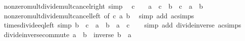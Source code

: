 \begin{isabellebody}
\isamarkupfalse%
%
\endisatagproof
{\isafoldproof}%
%
\isadelimproof
\isanewline
%
\endisadelimproof
\isanewline
{}\isamarkupfalse%
\ nonzero{\isacharunderscore}{\kern0pt}mult{\isacharunderscore}{\kern0pt}divide{\isacharunderscore}{\kern0pt}mult{\isacharunderscore}{\kern0pt}cancel{\isacharunderscore}{\kern0pt}right\ {\isacharbrackleft}{\kern0pt}simp{\isacharbrackright}{\kern0pt}{\isacharcolon}{\kern0pt}\isanewline
\ \ {\isachardoublequoteopen}c\ {\isasymnoteq}\ {}\ {\isasymLongrightarrow}\ {\isacharparenleft}{\kern0pt}a\ {\isacharasterisk}{\kern0pt}\ c{\isacharparenright}{\kern0pt}\ {\isacharslash}{\kern0pt}\ {\isacharparenleft}{\kern0pt}b\ {\isacharasterisk}{\kern0pt}\ c{\isacharparenright}{\kern0pt}\ {\isacharequal}{\kern0pt}\ a\ {\isacharslash}{\kern0pt}\ b{\isachardoublequoteclose}\isanewline
%
\isadelimproof
\ \ %
\endisadelimproof
%
\isatagproof
{}\isamarkupfalse%
\ nonzero{\isacharunderscore}{\kern0pt}mult{\isacharunderscore}{\kern0pt}divide{\isacharunderscore}{\kern0pt}mult{\isacharunderscore}{\kern0pt}cancel{\isacharunderscore}{\kern0pt}left\ {\isacharbrackleft}{\kern0pt}of\ c\ a\ b{\isacharbrackright}{\kern0pt}\ \isamarkupfalse%
\ {\isacharparenleft}{\kern0pt}simp\ add{\isacharcolon}{\kern0pt}\ ac{\isacharunderscore}{\kern0pt}simps{\isacharparenright}{\kern0pt}%
\endisatagproof
{\isafoldproof}%
%
\isadelimproof
\isanewline
%
\endisadelimproof
\isanewline
{}\isamarkupfalse%
\ times{\isacharunderscore}{\kern0pt}divide{\isacharunderscore}{\kern0pt}eq{\isacharunderscore}{\kern0pt}left\ {\isacharbrackleft}{\kern0pt}simp{\isacharbrackright}{\kern0pt}{\isacharcolon}{\kern0pt}\ {\isachardoublequoteopen}{\isacharparenleft}{\kern0pt}b\ {\isacharslash}{\kern0pt}\ c{\isacharparenright}{\kern0pt}\ {\isacharasterisk}{\kern0pt}\ a\ {\isacharequal}{\kern0pt}\ {\isacharparenleft}{\kern0pt}b\ {\isacharasterisk}{\kern0pt}\ a{\isacharparenright}{\kern0pt}\ {\isacharslash}{\kern0pt}\ c{\isachardoublequoteclose}\isanewline
%
\isadelimproof
\ \ %
\endisadelimproof
%
\isatagproof
{}\isamarkupfalse%
\ {\isacharparenleft}{\kern0pt}simp\ add{\isacharcolon}{\kern0pt}\ divide{\isacharunderscore}{\kern0pt}inverse\ ac{\isacharunderscore}{\kern0pt}simps{\isacharparenright}{\kern0pt}%
\endisatagproof
{\isafoldproof}%
%
\isadelimproof
\isanewline
%
\endisadelimproof
\isanewline
{}\isamarkupfalse%
\ divide{\isacharunderscore}{\kern0pt}inverse{\isacharunderscore}{\kern0pt}commute{\isacharcolon}{\kern0pt}\ {\isachardoublequoteopen}a\ {\isacharslash}{\kern0pt}\ b\ {\isacharequal}{\kern0pt}\ inverse\ b\ {\isacharasterisk}{\kern0pt}\ a{\isachardoublequoteclose}\isanewline

\end{isabellebody}

